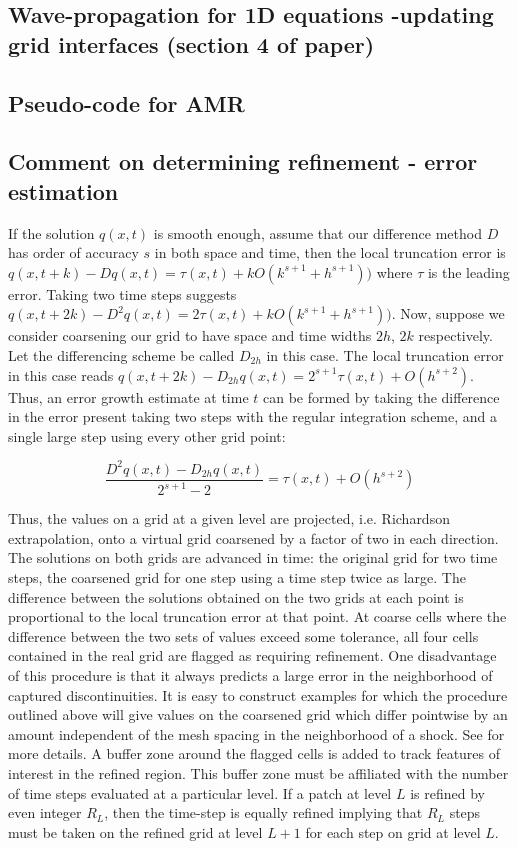 \documentclass[12pt,leqno]{article}
\begin{document}
 
\subsection{Wave-propagation for 1D equations -updating grid interfaces (section 4 of paper)}
\subsection{Pseudo-code for AMR}
\subsection{Comment on determining refinement - error estimation}\label{whentorefine}
If the solution $q(x,t)$ is smooth enough, assume that our difference method $D$ has order of accuracy $s$ in both 
space and time, then the local truncation error is $q(x,t+k) -D q(x,t) = \tau(x,t) + k O(k^{s+1}+h^{s+1}))$ where $\tau$ is the leading error.
Taking two time steps suggests $q(x,t+2k) -D^2 q(x,t) = 2\tau(x,t) + k O(k^{s+1}+h^{s+1}))$.
Now, suppose we consider coarsening our grid to have space and time widths $2h$, $2k$ respectively. Let the differencing scheme be called $D_{2h}$ in this case. The local truncation error in this case reads $q(x,t+2k) -D_{2h} q(x,t) = 2^{s+1}\tau(x,t) + O(h^{s+2})$. Thus, an error growth estimate at time $t$ can be formed by taking the difference in the error present taking two steps with the regular integration scheme, and a single large step using every other grid point:

\begin{equation}
\frac{D^2 q(x,t) - D_{2h} q(x,t)}{2^{s+1}-2} = \tau(x,t) + O(h^{s+2})
\end{equation}

Thus, the values on a grid at a given level are projected, i.e. Richardson extrapolation, onto a virtual grid coarsened by a factor of two in each direction. The solutions on both grids are advanced in time: the original grid for two time steps, the coarsened grid for one step using a time step twice as large. The difference between the solutions obtained on the two grids at each point is proportional to the local truncation error at that point. At coarse cells where the difference between the two sets of values exceed some tolerance, all four cells contained in the real grid are flagged as requiring refinement. One disadvantage of this procedure is that it always predicts a large error in the neighborhood of captured discontinuities. It is easy to construct examples for which the procedure outlined above will give values on the coarsened grid which differ pointwise by an amount independent of the mesh spacing in the neighborhood of a shock. See \cite{berg-coll} for more details. A buffer zone around the flagged cells is added to track features of interest in the refined region. This buffer zone must be affiliated with the number of time steps evaluated at a particular level. If a patch at level $L$ is refined by even integer $R_L$, then the time-step is equally refined implying that $R_L$ steps must be taken on the refined grid at level $L+1$ for each step on grid at level $L$. 
\end{document}
